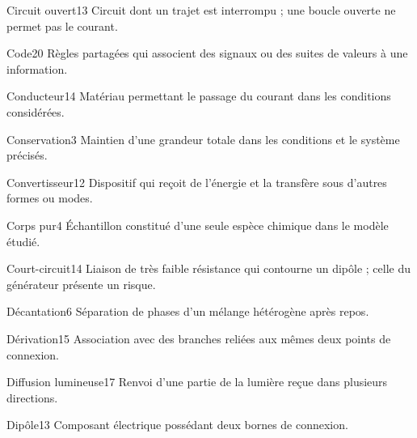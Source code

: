 \documentclass[12pt,twoside,openany]{book}
\begin{document}
\begin{pcLexique}{Circuit ouvert}{13}
Circuit dont un trajet est interrompu ; une boucle ouverte ne permet pas le courant.\par
\end{pcLexique}
\begin{pcLexique}{Code}{20}
Règles partagées qui associent des signaux ou des suites de valeurs à une information.\par
\end{pcLexique}
\begin{pcLexique}{Conducteur}{14}
Matériau permettant le passage du courant dans les conditions considérées.\par
\end{pcLexique}
\begin{pcLexique}{Conservation}{3}
Maintien d’une grandeur totale dans les conditions et le système précisés.\par
\end{pcLexique}
\begin{pcLexique}{Convertisseur}{12}
Dispositif qui reçoit de l’énergie et la transfère sous d’autres formes ou modes.\par
\end{pcLexique}
\begin{pcLexique}{Corps pur}{4}
Échantillon constitué d’une seule espèce chimique dans le modèle étudié.\par
\end{pcLexique}
\begin{pcLexique}{Court-circuit}{14}
Liaison de très faible résistance qui contourne un dipôle ; celle du générateur présente un risque.\par
\end{pcLexique}
\begin{pcLexique}{Décantation}{6}
Séparation de phases d’un mélange hétérogène après repos.\par
\end{pcLexique}
\begin{pcLexique}{Dérivation}{15}
Association avec des branches reliées aux mêmes deux points de connexion.\par
\end{pcLexique}
\begin{pcLexique}{Diffusion lumineuse}{17}
Renvoi d’une partie de la lumière reçue dans plusieurs directions.\par
\end{pcLexique}
\begin{pcLexique}{Dipôle}{13}
Composant électrique possédant deux bornes de connexion.\par
\end{pcLexique}
\end{document}
